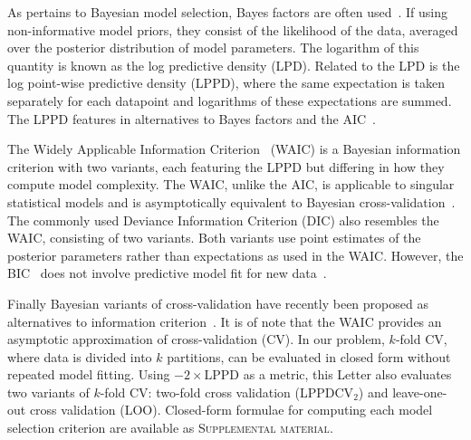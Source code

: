\documentclass[prl,twocolumn,groupedaddress]{revtex4-1}
\begin{document}
As pertains to Bayesian model selection,  Bayes factors are often used~\cite{lavine1999bayes,posada2004model}. If using non-informative model priors, they consist of the likelihood of the data, averaged over the posterior distribution of model parameters. The logarithm of this quantity is known as the log predictive density (LPD). Related to the LPD is the log point-wise predictive density (LPPD), where the same expectation is taken separately for each datapoint and logarithms of these expectations are summed. The LPPD features in alternatives to Bayes factors and the AIC~\cite{gelman2014understanding}.

The Widely Applicable Information Criterion~\cite{watanabe2010asymptotic,watanabe2013widely} (WAIC) is a Bayesian information criterion with two variants, each featuring the LPPD but differing in how they compute model complexity.  The WAIC, unlike the AIC, is applicable to singular statistical models and is asymptotically equivalent to Bayesian cross-validation~\cite{watanabe2010asymptotic}. The commonly used Deviance Information Criterion (DIC) also resembles the WAIC,  consisting of two variants. Both variants use point estimates of the posterior parameters rather than expectations as used in the WAIC.
However, the BIC~\cite{narlikar2013one} does not involve predictive model fit for new data~\cite{gelman2014understanding}.

Finally Bayesian variants of cross-validation have recently been proposed as alternatives to information criterion~\cite{gelman2014understanding}. It is of note that the WAIC provides an asymptotic approximation of cross-validation (CV). In our problem, $k$-fold CV, where data is divided into $k$ partitions, can be evaluated in closed form without repeated model fitting. Using $-2\times \textrm{LPPD}$ as a metric, this Letter also evaluates two variants of $k$-fold CV:
two-fold cross validation (LPPDCV$_2$) and leave-one-out cross validation (LOO).  Closed-form formulae for computing each model selection criterion are available as \textsc{Supplemental material}. 
\end{document}
